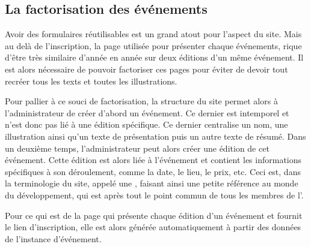 \subsection{La factorisation des événements}
\label{subsec:factorisation-evenements}

Avoir des formulaires réutilisables est un grand atout pour l'aspect  du site. Mais au delà de l'inscription, la page utilisée pour présenter chaque événements, rique d'être très similaire d'année en année sur deux éditions d'un même événement. Il est alors nécessaire de pouvoir factoriser ces pages pour éviter de devoir tout recréer tous les texts et toutes les illustrations.
\bigskip

Pour pallier à ce souci de factorisation, la structure du site permet alors à l'administrateur de créer d'abord un événement. Ce dernier est intemporel et n'est donc pas lié à une édition spécifique. Ce dernier centralise un nom, une illustration ainsi qu'un texte de présentation puis un autre texte de résumé. Dans un deuxième temps, l'administrateur peut alors créer une édition de cet événement. Cette édition est alors liée à l'événement et contient les informations spécifiques à son déroulement, comme la date, le lieu, le prix, etc. Ceci est, dans la terminologie du site, appelé une , faisant ainsi une petite référence au monde du développement, qui est après tout le point commun de tous les membres de l'\ofni.

Pour ce qui est de la page qui présente chaque édition d'un événement et fournit le lien d'inscription, elle est alors générée automatiquement à partir des données de l'instance d'événement.
